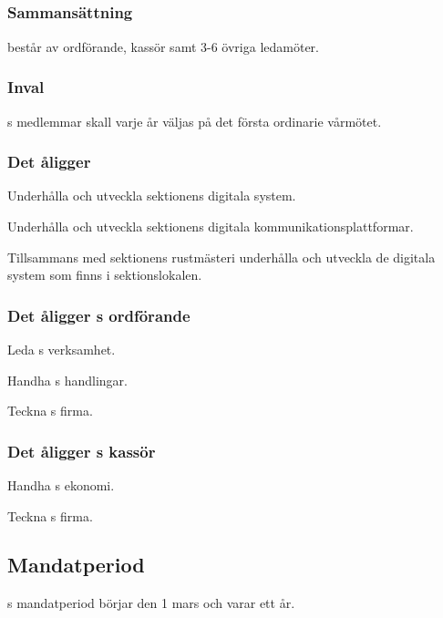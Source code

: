 \subsection{\DIGITFULL}
\subsubsection{Sammansättning}
\DIGIT{} består av ordförande, kassör samt 3-6 övriga ledamöter.

\subsubsection{Inval}
\DIGIT{}s medlemmar skall varje år väljas på det första ordinarie vårmötet.

\subsubsection{Det åligger \DIGIT}
\begin{att}
	\item Underhålla och utveckla sektionens digitala system.
	\item Underhålla och utveckla sektionens digitala kommunikationsplattformar.
	\item Tillsammans med sektionens rustmästeri underhålla och utveckla de digitala system som finns i sektionslokalen.
\end{att}

\subsubsection{Det åligger \DIGIT{}s ordförande}
\begin{att}
	\item Leda \DIGIT{}s verksamhet.
	\item Handha \DIGIT{}s handlingar.
	\item Teckna \DIGIT{}s firma.
\end{att}

\subsubsection{Det åligger \DIGIT{}s kassör}
\begin{att}
	\item Handha \DIGIT{}s ekonomi.
	\item Teckna \DIGIT{}s firma.
\end{att}

\subsection{Mandatperiod}
\DIGIT{}s mandatperiod börjar den 1 mars och varar ett år.